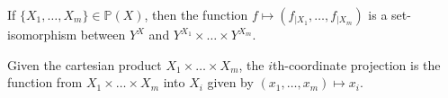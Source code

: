 If $\{X_1, \ldots, X_m\} \in \mathbb{P}(X)$, then the function $f \mapsto (f_{|X_1}, \ldots, f_{|X_m})$ is a set-isomorphism between $Y^X$ and $Y^{X_1} \times \ldots \times Y^{X_m}$.

Given the cartesian product $X_1 \times \ldots \times X_m$, the $i$th-coordinate projection is the function from $X_1 \times \ldots \times X_m$ into $X_i$ given by $(x_1, \ldots, x_m) \mapsto x_i$.
